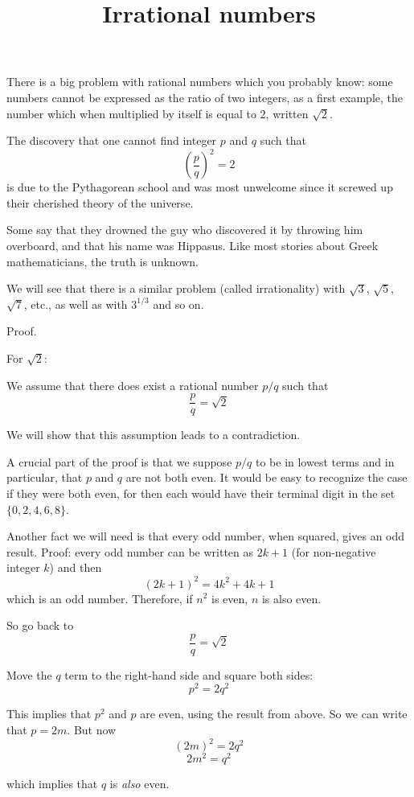 \documentclass[11pt, oneside]{article}
\title{Irrational numbers}
\date{}
\begin{document}
\maketitle
\Large

There is a big problem with rational numbers which you probably know:  some numbers cannot be expressed as the ratio of two integers, as a first example, the number which when multiplied by itself is equal to $2$, written $\sqrt{2}$.  

The discovery that one cannot find integer $p$ and $q$ such that
\[ (\frac{p}{q})^2 = 2 \]
is due to the Pythagorean school and was most unwelcome since it screwed up their cherished theory of the universe.  

Some say that they drowned the guy who discovered it by throwing him overboard, and that his name was Hippasus.  Like most stories about Greek mathematicians, the truth is unknown.

We will see that there is a similar problem (called irrationality) with $\sqrt{3}$, $\sqrt{5}$, $\sqrt{7}$, etc., as well as with $3^{1/3}$ and so on.

Proof.

For $\sqrt{2}$:

We assume that there does exist a rational number $p/q$ such that
\[ \frac{p}{q} = \sqrt{2}  \]

We will show that this assumption leads to a contradiction.

A crucial part of the proof is that we suppose $p/q$ to be in lowest terms and in particular, that $p$ and $q$ are not both even.  It would be easy to recognize the case if they were both even, for then each would have their terminal digit in the set $\{ 0, 2, 4, 6, 8 \}$.

Another fact we will need is that every odd number, when squared, gives an odd result.  Proof:  every odd number can be written as $2k+1$ (for non-negative integer $k$) and then
\[ (2k+1)^2 = 4k^2 + 4k + 1 \]
which is an odd number.  Therefore, if $n^2$ is even, $n$ is also even.

So go back to 
\[ \frac{p}{q} = \sqrt{2}  \]

Move the $q$ term to the right-hand side and square both sides:
\[ p^2 = 2q^2 \]

This implies that $p^2$ and $p$ are even, using the result from above.   So we can write that $p = 2m$. But now
\[ (2m)^2 = 2q^2 \]
\[ 2m^2 = q^2 \]

which implies that $q$ is \emph{also} even.
\end{document}
